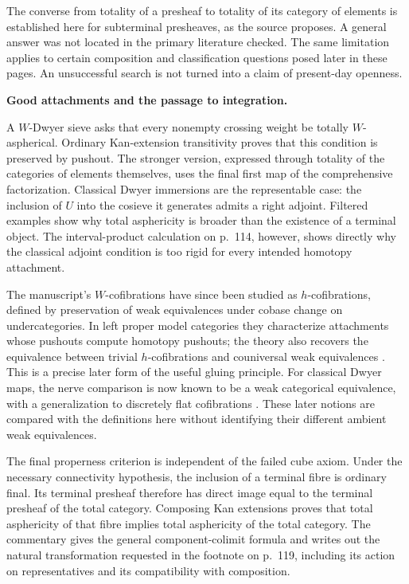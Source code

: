 The converse from totality of a presheaf to totality of its category of elements is established here for subterminal presheaves, as the source proposes. A general answer was not located in the primary literature checked. The same limitation applies to certain composition and classification questions posed later in these pages. An unsuccessful search is not turned into a claim of present-day openness.

\medskip
{}
\noindent\textbf{Good attachments and the passage to integration.}

A $W$-Dwyer sieve asks that every nonempty crossing weight be totally $W$-aspherical. Ordinary Kan-extension transitivity proves that this condition is preserved by pushout. The stronger version, expressed through totality of the categories of elements themselves, uses the final first map of the comprehensive factorization. Classical Dwyer immersions are the representable case: the inclusion of $U$ into the cosieve it generates admits a right adjoint. Filtered examples show why total asphericity is broader than the existence of a terminal object. The interval-product calculation on p.~114, however, shows directly why the classical adjoint condition is too rigid for every intended homotopy attachment.

The manuscript's $W$-cofibrations have since been studied as $h$-cofibrations, defined by preservation of weak equivalences under cobase change on undercategories. In left proper model categories they characterize attachments whose pushouts compute homotopy pushouts; the theory also recovers the equivalence between trivial $h$-cofibrations and couniversal weak equivalences \citep[Proposition~1.6, Corollary~1.9 and Lemma~1.10]{BataninBerger2017}. This is a precise later form of the useful gluing principle. For classical Dwyer maps, the nerve comparison is now known to be a weak categorical equivalence, with a generalization to discretely flat cofibrations \citep[Theorems~1.5--1.6]{HackneyOzornovaRiehlRovelli2024}. These later notions are compared with the definitions here without identifying their different ambient weak equivalences.

The final properness criterion is independent of the failed cube axiom. Under the necessary connectivity hypothesis, the inclusion of a terminal fibre is ordinary final. Its terminal presheaf therefore has direct image equal to the terminal presheaf of the total category. Composing Kan extensions proves that total asphericity of that fibre implies total asphericity of the total category. The commentary gives the general component-colimit formula and writes out the natural transformation requested in the footnote on p.~119, including its action on representatives and its compatibility with composition.


